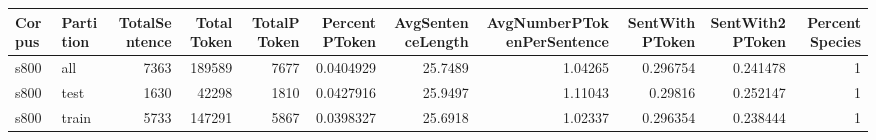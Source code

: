 \begin{tabular}{llrrrrrrrrr}
\hline
 Corpus   & Partition   &   TotalSentence &   TotalToken &   TotalPToken &   PercentPToken &   AvgSentenceLength &   AvgNumberPTokenPerSentence &   SentWithPToken &   SentWith2PToken &   PercentSpecies \\
\hline
 s800     & all         &            7363 &       189589 &          7677 &       0.0404929 &             25.7489 &                      1.04265 &         0.296754 &          0.241478 &                1 \\
 s800     & test        &            1630 &        42298 &          1810 &       0.0427916 &             25.9497 &                      1.11043 &         0.29816  &          0.252147 &                1 \\
 s800     & train       &            5733 &       147291 &          5867 &       0.0398327 &             25.6918 &                      1.02337 &         0.296354 &          0.238444 &                1 \\
\hline
\end{tabular}